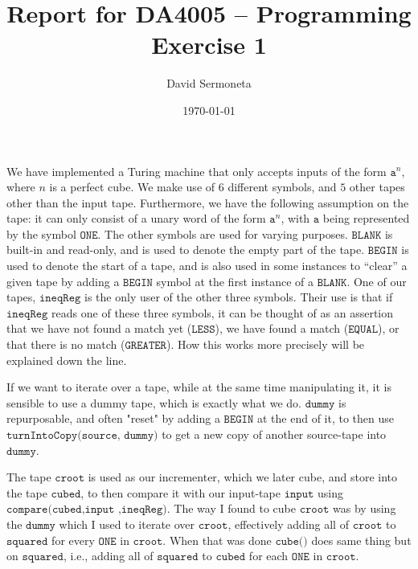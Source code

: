 \documentclass[11pt,a4paper]{article}
\title{Report for DA4005 -- Programming Exercise 1}
\author{David Sermoneta}
\date{\today}
\begin{document}
\maketitle 
We have implemented a Turing machine that only accepts inputs of the form
$\texttt{a}^{n}$, where $n$ is a perfect cube. We make use of $6$ different
symbols, and $5$ other tapes other than the input tape. Furthermore, we have
the following assumption on the tape: it can only consist of a unary word of
the form $\texttt{a}^{n}$, with $\texttt{a}$ being represented by the symbol
$\texttt{ONE}$. The other symbols are used for varying purposes.
$\texttt{BLANK}$ is built-in and read-only, and is used to denote the empty part of the tape. 
 $\texttt{BEGIN}$ is used to denote the start of a tape, and is also used in some instances to ``clear''
a given tape by adding a $\texttt{BEGIN}$ symbol at the first instance of a
$\texttt{BLANK}$.  One of our tapes, $\texttt{ineqReg}$ is the only user of the
other three symbols. Their use is that if $\texttt{ineqReg}$ reads one of these
three symbols, it can be thought of as an assertion that we have not found a
match yet ($\texttt{LESS}$), we have found a match ($\texttt{EQUAL}$), or that
there is no match ($\texttt{GREATER}$). How this works more precisely will be
explained down the line.

If we want to iterate over a tape, while at the same time manipulating it, it is sensible to use a dummy tape, which is exactly what we do. $\texttt{dummy}$ is repurposable, and often "reset" by adding a $\texttt{BEGIN}$ at the end of it, to then use $\texttt{turnIntoCopy(source, dummy)}$ to get a new copy of another source-tape into $\texttt{dummy}$. 

The tape $\texttt{croot}$ is used as our incrementer, which we later cube, and
store into the tape $\texttt{cubed}$, to then compare it with our input-tape
$\texttt{input}$ using $\texttt{compare} \texttt{(cubed,input}$ $\texttt{,ineqReg)}$.
The way I found to cube $\texttt{croot}$ was by using the $\texttt{dummy}$ which I used to iterate over $\texttt{croot}$, effectively adding all of $\texttt{croot}$ to $\texttt{squared}$ for every $\texttt{ONE}$ in $\texttt{croot}$. When that was done $\texttt{cube()}$ does same thing but on $\texttt{squared}$, i.e., adding all of $\texttt{squared}$ to $\texttt{cubed}$ for each $\texttt{ONE}$ in $\texttt{croot}$.
\end{document}
